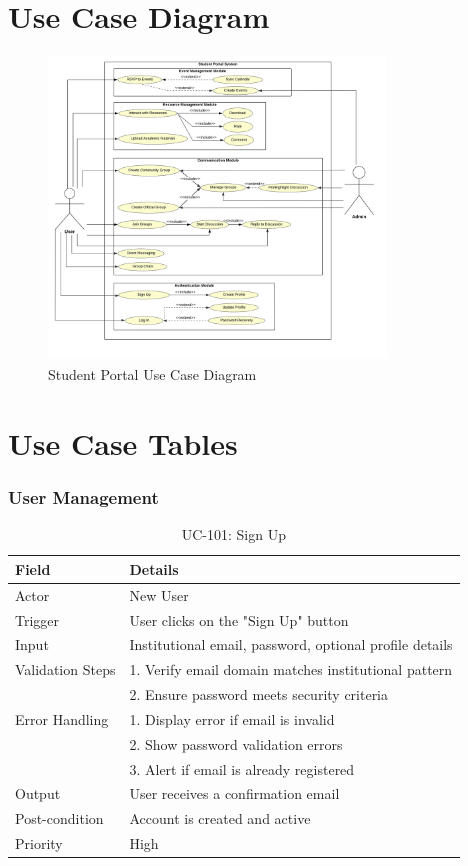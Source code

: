 \section{Use Case Diagram}
\begin{figure}[H]
    \centering
    \includegraphics[width=0.8\textwidth]{images/use_case_diagram.png}
    \caption{Student Portal Use Case Diagram}
    \label{fig:use_case}
\end{figure}



\section{Use Case Tables}
\subsubsection{User Management}
\begin{table}[H]
\centering
\caption{UC-101: Sign Up}
\begin{tabular}{|l|p{10cm}|}
\hline
\textbf{Field} & \textbf{Details} \\ \hline
Actor & New User \\ \hline
Trigger & User clicks on the "Sign Up" button \\ \hline
Input & Institutional email, password, optional profile details \\ \hline
Validation Steps & 1. Verify email domain matches institutional pattern \\ 
                 & 2. Ensure password meets security criteria \\ \hline
Error Handling & 1. Display error if email is invalid \\ 
               & 2. Show password validation errors \\ 
               & 3. Alert if email is already registered \\ \hline
Output & User receives a confirmation email \\ \hline
Post-condition & Account is created and active \\ \hline
Priority & High \\ \hline
\end{tabular}
\end{table}

